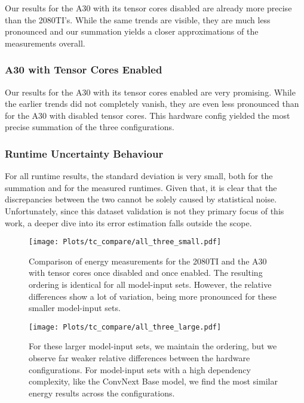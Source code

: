 Our results for the A30 with its tensor cores disabled are already more precise than the 2080TI's. While the same trends are visible, they are much less pronounced and our summation yields a closer approximations of the measurements overall. 


\subsubsection{A30 with Tensor Cores Enabled}
Our results for the A30 with its tensor cores enabled are very promising. While the earlier trends did not completely vanish, they are even less pronounced than for the A30 with disabled tensor cores. This hardware config yielded the most precise summation of the three configurations.

\subsubsection{Runtime Uncertainty Behaviour}
For all runtime results, the standard deviation is very small, both for the summation and for the measured runtimes. Given that, it is clear that the discrepancies between the two cannot be solely caused by statistical noise. \\
Unfortunately, since this dataset validation is not they primary focus of this work, a deeper dive into its error estimation falls outside the scope.

\begin{figure}
    \center\texttt{[image: Plots/tc\_compare/all\_three\_small.pdf]}
    \caption{Comparison of energy measurements for the 2080TI and the A30 with tensor cores once disabled and once enabled. The resulting ordering is identical for all model-input sets. However, the relative differences show a lot of variation, being more pronounced for these smaller model-input sets.}
    \label{fig:tcnotcsmall}
    \texttt{[image: Plots/tc\_compare/all\_three\_large.pdf]}
    \caption{For these larger model-input sets, we maintain the ordering, but we observe far weaker relative differences between the hardware configurations. For model-input sets with a high dependency complexity, like the ConvNext Base model, we find the most similar energy results across the configurations.}
    \label{fig:tcnotclarge}
\end{figure}


\setcounter{savedpage}{\value{page}}


